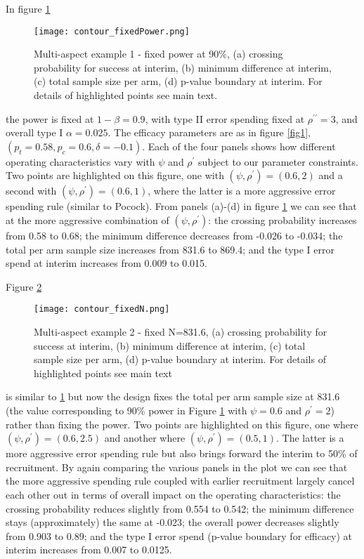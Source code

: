 \documentclass{article}
\begin{document}
In figure \ref{fig2} 
\begin{figure}[htb]
	\centering\caption{Multi-aspect example 1 - fixed power at 90\%, (a) crossing probability for success at interim, (b) minimum difference at interim, (c) total sample size per arm, (d) p-value boundary at interim. For details of highlighted points see main text.} 
	\vspace*{0.3cm}
	\texttt{[image: contour\_fixedPower.png]}
	
	\label{fig2}
\end{figure}
the power is fixed at $1-\beta=0.9$, with type II error spending fixed at $\rho^{\prime\prime}=3$, and overall type I $\alpha=0.025$. The efficacy parameters are as in figure \ref{fig1}, $(p_t=0.58, p_c=0.6, \delta=-0.1)$. Each of the four panels shows how different operating characteristics vary with $\psi$ and $\rho^{\prime}$ subject to our parameter constraints. Two points are highlighted on this figure, one with $(\psi,\rho^{\prime})=(0.6,2)$ and a second with $(\psi,\rho^{\prime})=(0.6,1)$, where the latter is a more aggressive error spending rule (similar to Pocock). From panels (a)-(d) in figure \ref{fig2} we can see that at the more aggressive combination of $(\psi,\rho^{\prime})$: the crossing probability increases from 0.58 to 0.68; the minimum difference decreases from -0.026 to -0.034; the total per arm sample size increases from 831.6 to 869.4; and the type I error spend at interim increases from 0.009 to 0.015. 

Figure \ref{fig3}
\begin{figure}[htb]
	\centering\caption{Multi-aspect example 2 - fixed N=831.6, (a) crossing probability for success at interim, (b) minimum difference at interim, (c) total sample size per arm, (d) p-value boundary at interim. For details of highlighted points see main text} \label{fig3}
	\vspace*{0.3cm}
	\texttt{[image: contour\_fixedN.png]}
\end{figure} is similar to \ref{fig2} but now the design fixes the total per arm sample size at 831.6 (the value corresponding to 90\% power in Figure \ref{fig2} with $\psi=0.6$ and $\rho^{\prime}=2$) rather than fixing the power. Two points are highlighted on this figure, one where $(\psi,\rho^{\prime})=(0.6,2.5)$ and another where $(\psi,\rho^{\prime})=(0.5,1)$. The latter is a more aggressive error spending rule but also brings forward the interim to 50\% of recruitment. By again comparing the various panels in the plot we can see that the more aggressive spending rule coupled with earlier recruitment largely cancel each other out in terms of overall impact on the operating characteristics: the crossing probability reduces slightly from 0.554 to 0.542; the minimum difference stays (approximately) the same at -0.023; the overall power decreases slightly from 0.903 to 0.89; and the type I error spend (p-value boundary for efficacy) at interim increases from 0.007 to 0.0125.   
\end{document}
